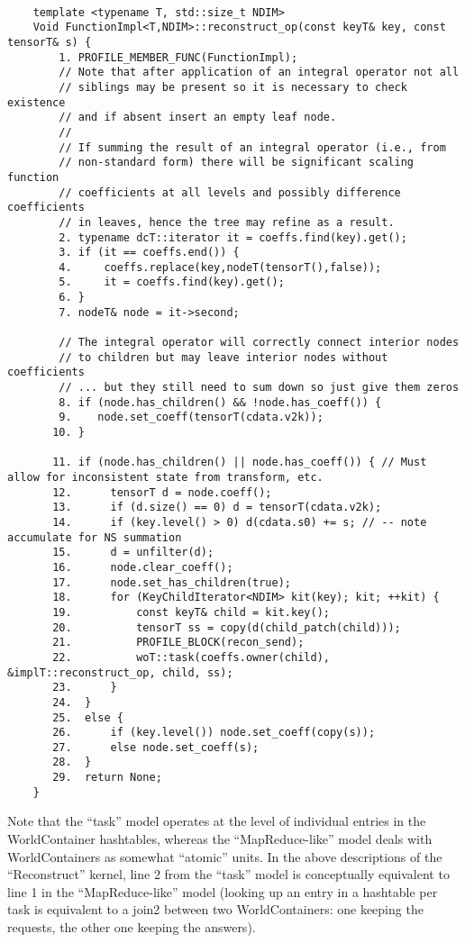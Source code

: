 \documentclass{article}
\begin{document}
{\tt
  \begin{verbatim}
    template <typename T, std::size_t NDIM>
    Void FunctionImpl<T,NDIM>::reconstruct_op(const keyT& key, const tensorT& s) {
        1. PROFILE_MEMBER_FUNC(FunctionImpl);
        // Note that after application of an integral operator not all
        // siblings may be present so it is necessary to check existence
        // and if absent insert an empty leaf node.
        //
        // If summing the result of an integral operator (i.e., from
        // non-standard form) there will be significant scaling function
        // coefficients at all levels and possibly difference coefficients
        // in leaves, hence the tree may refine as a result.
        2. typename dcT::iterator it = coeffs.find(key).get();
        3. if (it == coeffs.end()) {
        4.     coeffs.replace(key,nodeT(tensorT(),false));
        5.     it = coeffs.find(key).get();
        6. }
        7. nodeT& node = it->second;
        
        // The integral operator will correctly connect interior nodes
        // to children but may leave interior nodes without coefficients
        // ... but they still need to sum down so just give them zeros
        8. if (node.has_children() && !node.has_coeff()) {
        9.    node.set_coeff(tensorT(cdata.v2k));
       10. }
        
       11. if (node.has_children() || node.has_coeff()) { // Must allow for inconsistent state from transform, etc.
       12.      tensorT d = node.coeff();
       13.      if (d.size() == 0) d = tensorT(cdata.v2k);
       14.      if (key.level() > 0) d(cdata.s0) += s; // -- note accumulate for NS summation
       15.      d = unfilter(d);
       16.      node.clear_coeff();
       17.      node.set_has_children(true);
       18.      for (KeyChildIterator<NDIM> kit(key); kit; ++kit) {
       19.          const keyT& child = kit.key();
       20.          tensorT ss = copy(d(child_patch(child)));
       21.          PROFILE_BLOCK(recon_send);
       22.          woT::task(coeffs.owner(child), &implT::reconstruct_op, child, ss);
       23.      }
       24.  }
       25.  else {
       26.      if (key.level()) node.set_coeff(copy(s));
       27.      else node.set_coeff(s);
       28.  }
       29.  return None;
    }
  \end{verbatim}
}

Note that the ``task'' model operates at the level of individual entries in 
the WorldContainer hashtables, whereas the ``MapReduce-like'' model deals with
WorldContainers as somewhat ``atomic'' units. In the above descriptions
of the ``Reconstruct'' kernel, line 2 from the ``task'' model is conceptually 
equivalent to line 1 in the ``MapReduce-like'' model (looking up an entry
in a hashtable per task is equivalent to a join2 between two WorldContainers:
one keeping the requests, the other one keeping the answers).
\end{document}
